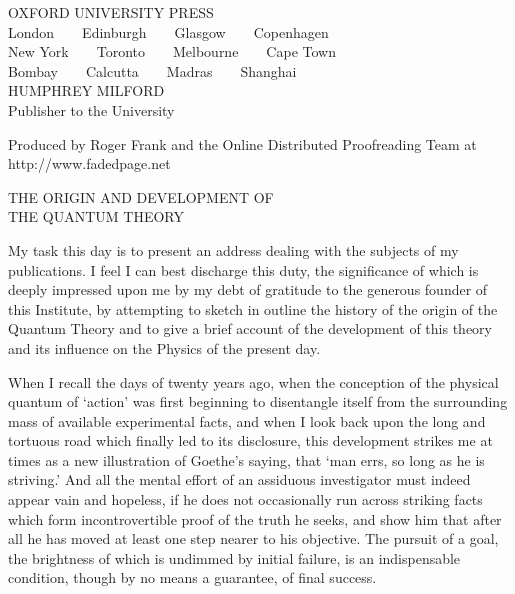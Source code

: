 \documentclass[12pt,oneside]{book}
\begin{document}
\clearpage
\begin{center}
\vspace*{4cm}
OXFORD UNIVERSITY PRESS\\
\vspace{2mm}
London~~~~Edinburgh~~~~Glasgow~~~~Copenhagen\\
New York~~~~Toronto~~~~Melbourne~~~~Cape Town\\
Bombay~~~~Calcutta~~~~Madras~~~~Shanghai\\
\vspace{2mm}
HUMPHREY MILFORD\\
Publisher to the University
\end{center}

\vfill
\begin{center}
\small
Produced by Roger Frank and the Online Distributed
Proofreading Team at http://www.fadedpage.net
\end{center}

\clearpage

\vspace*{3mm}
\begin{center}
\begin{Large}THE ORIGIN AND DEVELOPMENT OF\\
\vspace*{2mm}
THE QUANTUM THEORY\end{Large}
\end{center}
\vspace{5mm}
\chead{(\thepage)} %
{\sc My} task this day is to present an address dealing with
the subjects of my publications. I feel I can best discharge
this duty, the significance of which is deeply
impressed upon me by my debt of gratitude to the
generous founder of this Institute, by attempting to sketch
in outline the history of the origin of the Quantum Theory
and to give a brief account of the development of this theory
and its influence on the Physics of the present day.

When I recall the days of twenty years ago, when the
conception of the physical quantum of `action' was first
beginning to disentangle itself from the surrounding mass
of available experimental facts, and when I look back upon
the long and tortuous road which finally led to its disclosure,
this development strikes me at times as a new illustration
of Goethe's saying, that `man errs, so long as he is striving.'
And all the mental effort of an assiduous investigator must
indeed appear vain and hopeless, if he does not occasionally
run across striking facts which form incontrovertible proof
of the truth he seeks, and show him that after all he has
moved at least one step nearer to his objective. The
pursuit of a goal, the brightness of which is undimmed by
initial failure, is an indispensable condition, though by no
means a guarantee, of final success.
\end{document}
